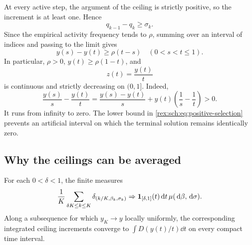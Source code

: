 At every active step, the argument of the ceiling is strictly positive,
so the increment is at least one. Hence
\[
 q_{k-1}-q_k\geq\sigma_k.
\]
Since the empirical activity frequency tends to $\rho$, summing over
an interval of indices and passing to the limit gives
\begin{equation}\label{rex:sch:eq:positive-selection}
 y(s)-y(t)\geq\rho(t-s)\quad(0<s<t\leq1).
\end{equation}
In particular, $\rho>0$, $y(t)\geq\rho(1-t)$, and
\begin{equation}\label{rex:sch:eq:z-definition}
 z(t)=\frac{y(t)}{t}
\end{equation}
is continuous and strictly decreasing on $(0,1]$. Indeed,
\[
 \frac{y(s)}s-\frac{y(t)}t
 =\frac{y(s)-y(t)}s+y(t)\left(\frac1s-\frac1t\right)>0.
\]
It runs from infinity to zero. The lower bound in
\eqref{rex:sch:eq:positive-selection} prevents an artificial interval on which
the terminal solution remains identically zero.

\subsection{Why the ceilings can be averaged}

\begin{lemma}\label{rex:sch:lem:joint}
For each $0<\delta<1$, the finite measures
\begin{equation}\label{rex:sch:eq:joint-empirical}
 \frac1K\sum_{\delta K\leq k\leq K}
 \delta_{(k/K,\beta_k,\sigma_k)}
 \mathrel{\Rightarrow}\mathbf 1_{[\delta,1]}(t)\,\mathrm d t\,\mu(\,\mathrm d\beta,\,\mathrm d\sigma).
\end{equation}
Along a subsequence for which $y_K\to y$ locally uniformly,
the corresponding integrated ceiling increments converge to
$\int D(y(t)/t)\dd t$ on every compact time interval.
\end{lemma}

